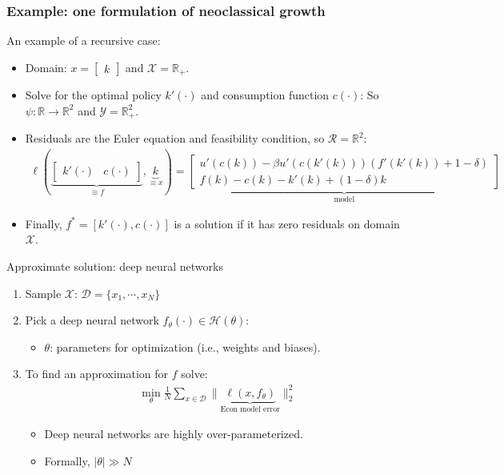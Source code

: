 \documentclass[aspectratio=169,10pt]{beamer}
\newcommand{\R}{\ensuremath{\mathbb{R}}}
\newcommand{\Xdom}{\mathcal{X}}
\newcommand{\Yrange}{\mathcal{Y}}
\newcommand{\Resid}{\mathcal{R}}
\begin{document}
\begin{frame}
	\frametitle{Example: one formulation of neoclassical growth}
	An example of a recursive case:
	\begin{itemize}
		\item Domain: $x = \begin{bmatrix*}
			k
		\end{bmatrix*}
		$ and $\Xdom = \R_+$.\vspace{0.1in}
		\item Solve for the optimal policy $k'(\cdot)$ and consumption function $c(\cdot)$: So $\psi : \R \to \R^2$ and $\Yrange = \R^2_+$.\vspace{0.1in}
		\item  Residuals are the Euler equation and feasibility condition, so $\Resid = \R^2$:
		\begin{align*}
			\ell(\underbrace{\begin{bmatrix*}k'(\cdot) & c(\cdot)\end{bmatrix*}}_{\equiv f}, \underbrace{k}_{\equiv x}) =
			\underbrace{\begin{bmatrix*}
					u'(c(k)) - \beta u'(c(k'(k)))\left(f'(k'(k)) + 1-\delta\right) \\
					f(k) - c(k) - k'(k) + (1-\delta)k
			\end{bmatrix*}}_{\text{model}}
		\end{align*}
		\item Finally,  $f^* = \left[k'(\cdot),c(\cdot)\right]$ is a solution if it has zero residuals on domain $\Xdom$.
	\end{itemize}
\end{frame}


\begin{frame}{Approximate solution: deep neural networks }
	\begin{enumerate}
		\item Sample $\mathcal{X}$: $\mathcal{D} = \{x_1,\cdots,x_N\}$
		\vspace{0.025in}
		\item Pick a deep neural network $f_\theta(\cdot) \in \mathcal{H}(\theta)$:
		\begin{itemize}
			\item $\theta$: parameters for optimization (i.e., weights and biases).  
		\end{itemize}
		\vspace{0.025in}
		\item To find an approximation for $f$ solve:
		\begin{align*}
			\min_{\theta } \frac{1}{N}\sum_{x \in \mathcal{D}} \|\underbrace{\ell(x,f_\theta)}_{\text{Econ model error}}\|_2^2
		\end{align*}
		\begin{itemize}
			\item Deep neural networks are highly over-parameterized.
			\item Formally, $|\theta|\gg N$ 
		\end{itemize}
	\end{enumerate}
\end{frame}
\end{document}
